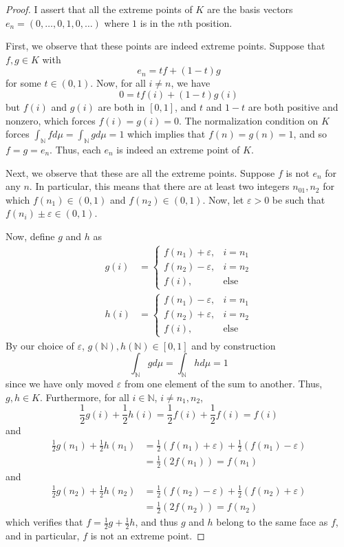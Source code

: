 \documentclass[fontsize=11pt]{scrartcl} %
\numberwithin{equation}{section} %
\numberwithin{figure}{section} %
\numberwithin{table}{section} %
\newcommand{\N}{\mathbb{N}}
\begin{document}
\begin{proof}
    I assert that all the extreme points of $K$ are the basis vectors $e_n =
    (0,\dots,0,1,0,\dots)$ where $1$ is in the $n$th position.
    
    First, we observe that these points are indeed extreme points. Suppose that
    $f,g\in K$ with
    \[
        e_n = tf + (1-t)g
    \]
    for some $t\in (0,1)$. Now, for all $i\neq n$, we have
    \[
        0 = tf(i) + (1-t)g(i)
    \]
    but $f(i)$ and $g(i)$ are both in $[0,1]$, and $t$ and $1-t$ are both
    positive and nonzero, which forces $f(i)=g(i)=0$. The normalization
    condition on $K$ forces $\int_{\N}fd\mu = \int_{\N}gd\mu = 1$ which implies
    that $f(n)=g(n) = 1$, and so $f=g=e_n$. Thus, each $e_n$ is indeed an
    extreme point of $K$.

    Next, we observe that these are all the extreme points. Suppose $f$ is not
    $e_n$ for any $n$. In particular, this means that there are at least two
    integers $n_01,n_2$ for which $f(n_1)\in (0,1)$ and $f(n_2)\in (0,1)$. Now,
    let $\varepsilon>0$ be such that $f(n_i)\pm\varepsilon\in (0,1)$.

    Now, define $g$ and $h$ as
    \[
\begin{aligned}
    g(i) &=
\begin{cases}
    f(n_1) + \varepsilon, &i=n_1\\
    f(n_2) - \varepsilon, &i=n_2\\
    f(i), &\text{else}
\end{cases}\\
    h(i) &=
\begin{cases}
    f(n_1) - \varepsilon, &i=n_1\\
    f(n_2) + \varepsilon, &i=n_2\\
    f(i), &\text{else}
\end{cases}
\end{aligned}
    \]
    By our choice of $\varepsilon$, $g(\N),h(\N)\in [0,1]$ and by construction
    \[
        \int_{\N}gd\mu = \int_{\N}hd\mu = 1
    \]
    since we have only moved $\varepsilon$ from one element of the sum to
another. Thus, $g,h\in K$. Furthermore, for all $i\in \N$, $i\neq n_1,n_2$,
    \[
        \frac{1}{2}g(i) +\frac{1}{2}h(i) = \frac{1}{2}f(i)+\frac{1}{2}f(i) =
        f(i)
    \]
    and
    \[
        \begin{aligned}
            \frac{1}{2}g(n_1) + \frac{1}{2}h(n_1) &=
            \frac{1}{2}(f(n_1)+\varepsilon) + \frac{1}{2}(f(n_1)-\varepsilon)\\
            &= \frac{1}{2}(2f(n_1)) = f(n_1)
    \end{aligned}
    \]
    and
    \[
        \begin{aligned}
            \frac{1}{2}g(n_2) + \frac{1}{2}h(n_2) &=
            \frac{1}{2}(f(n_2)-\varepsilon) + \frac{1}{2}(f(n_2)+\varepsilon)\\
            &= \frac{1}{2}(2f(n_2)) = f(n_2)
    \end{aligned}
    \]
    which verifies that $f = \frac{1}{2}g + \frac{1}{2}h$, and thus $g$ and $h$
    belong to the same face as $f$, and in particular, $f$ is not an extreme
    point.
\end{proof}
\end{document}
